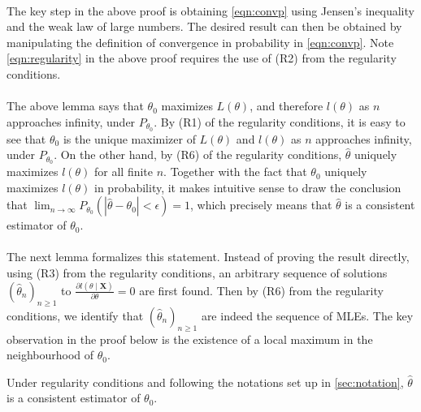 $ $\\
The key step in the above proof is obtaining \cref{eqn:convp} using Jensen's inequality and the weak law of large numbers. The desired result can then be obtained by manipulating the definition of convergence in probability in \cref{eqn:convp}. Note \cref{eqn:regularity} in the above proof requires the use of (R2) from the regularity conditions.\\\\
The above lemma says that $\theta_0$ maximizes $L(\theta)$, and therefore $l(\theta)$ as $n$ approaches infinity, under $P_{\theta_0}$. By (R1) of the regularity conditions, it is easy to see that $\theta_0$ is the unique maximizer of $L(\theta)$ and $l(\theta)$ as $n$ approaches infinity, under $P_{\theta_0}$. On the other hand, by (R6) of the regularity conditions, $\hat{\theta}$ uniquely maximizes $l(\theta)$ for all finite $n$. Together with the fact that $\theta_0$ uniquely maximizes $l(\theta)$ in probability, it makes intuitive sense to draw the conclusion that $\lim_{n\to\infty}P_{\theta_0}\left(| \hat{\theta} - \theta_0 | < \epsilon \right) = 1$, which precisely means that $\hat{\theta}$ is a consistent estimator of $\theta_0$.\\\\
The next lemma formalizes this statement. Instead of proving the result directly, using (R3) from the regularity conditions, an arbitrary sequence of solutions $\left(\hat{\theta}_n\right)_{n\geq1}$ to $\frac{\partial l(\theta\mid \bm{X})}{\partial\theta}=0$ are first found. Then by (R6) from the regularity conditions, we identify that $\left(\hat{\theta}_n\right)_{n\geq1}$ are indeed the sequence of MLEs. The key observation in the proof below is the existence of a local maximum in the neighbourhood of $\theta_0$.
\begin{lemma}\label{lem:3}
Under regularity conditions and following the notations set up in \cref{sec:notation}, $\hat{\theta}$ is a consistent estimator of $\theta_0$.
\end{lemma}
